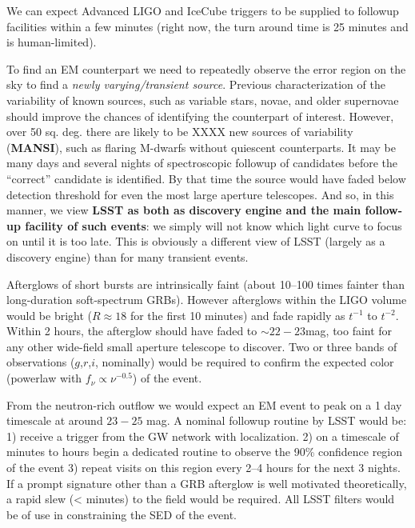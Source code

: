 \documentclass [11pt]{article}
\begin{document}
We can expect Advanced LIGO and IceCube triggers to be supplied to followup facilities within a few minutes (right now, the turn around time is 25 minutes and is human-limited).

To find an EM counterpart we need to repeatedly observe the error region on the sky to find a {\it newly varying/transient source}.  Previous characterization of the variability of known sources, such as variable stars, novae, and older supernovae should improve the chances of identifying the counterpart of interest. However, over 50 sq. deg. there are likely to be XXXX new sources of variability ({\bf MANSI}), such as flaring M-dwarfs without quiescent counterparts. It may be many days and several nights of spectroscopic followup of candidates before the ``correct'' candidate is identified. By that time the source would have faded below detection threshold for even the most large aperture telescopes. And so, in this manner, we view {\bf LSST as both as discovery engine and the main follow-up facility of such events}: we simply will not know which light curve to focus on until it is too late. This is obviously a different view of LSST (largely as a discovery engine) than  for many transient events.

Afterglows of short bursts are intrinsically faint (about 10--100 times fainter than long-duration soft-spectrum GRBs). However afterglows within the LIGO volume would be bright ($R\approx 18$ for the first 10 minutes) and fade rapidly as $t^{-1}$ to $t^{-2}$. Within 2 hours, the afterglow should have faded to $\sim22-23$mag, too faint for any other wide-field small aperture telescope to discover. Two or three bands of observations ($g$,$r$,$i$, nominally) would be required to confirm the expected color (powerlaw with $f_\nu \propto \nu^{-0.5}$) of the event.

From the neutron-rich outflow we would expect an EM event to peak on a 1 day timescale at around $23-25$ mag. A nominal followup routine by LSST would be: 1) receive a trigger from the GW network with localization. 2) on a timescale of minutes to hours begin a dedicated routine to observe the 90\% confidence region of the event 3) repeat visits on this region every 2--4 hours for the next 3 nights. If a prompt signature other than a GRB afterglow is well motivated theoretically, a rapid slew (< minutes) to the field would be required.  All LSST filters would be of use in constraining the SED of the event.
\end{document}

